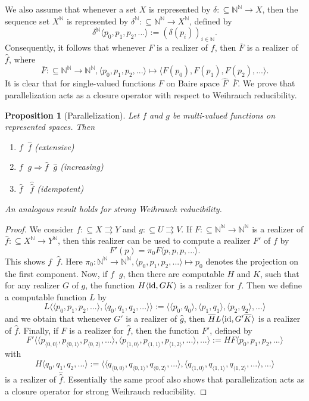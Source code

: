 \documentclass[jsl,10pt]{noasl}
\def\IN{{\mathbb{N}}}
\def\TO{\Longrightarrow}
\def\In{\subseteq}
\def\mto{\rightrightarrows}
\def\id{{\rm id}}
\def\leqW{\mathop{\leq_{\mathrm{W}}}}
\def\equivW{\mathop{\equiv_{\mathrm{W}}}}
\def\equivSW{\mathop{\equiv_{\mathrm{sW}}}}
\newtheorem{proposition}{Proposition}[section]
\begin{document}
We also assume that whenever a set $X$ is represented by $\delta:\In\IN^\IN\to X$, then
the sequence set $X^\IN$ is represented by $\delta^\IN:\In\IN^\IN\to X^\IN$, defined by
\[\delta^\IN\langle p_0,p_1,p_2,...\rangle:=(\delta(p_i))_{i\in\IN}.\]
Consequently, it follows that whenever $F$ is a realizer of $f$, then
$\overline{F}$ is a realizer of $\widehat{f}$, where 
\[\overline{F}:\In\IN^\IN\to\IN^\IN,\langle p_0,p_1,p_2,...\rangle\mapsto\langle F(p_0),F(p_1),F(p_2),...\rangle.\]
It is clear that for single-valued functions $F$ 
on Baire space $\widehat{F}\equivSW\overline{F}$.
We prove that parallelization acts as a closure operator with
respect to Weihrauch reducibility.

\begin{proposition}[Parallelization]
\label{prop:parallelization}
Let $f$ and $g$ be multi-valued functions on represented spaces. Then
\begin{enumerate}
\item $f\leqW\widehat{f}$                       \hfill (extensive)
\item $f\leqW g\TO\widehat{f}\leqW\widehat{g}$  \hfill (increasing)
\item $\widehat{f}\equivW\;\widehat{\!\!\widehat{f}}$ \hfill (idempotent)
\end{enumerate}
An analogous result holds for strong Weihrauch reducibility.
\end{proposition}
\begin{proof}
We consider $f:\In X\mto Y$ and $g:\In U\mto V$.
If $F:\In\IN^\IN\to\IN^\IN$ is a realizer of $\widehat{f}:\In X^\IN\to Y^\IN$,
then this realizer can be used to compute a realizer $F'$ of $f$ by
\[F'(p)=\pi_0F\langle p,p,p,...\rangle.\]
This shows $f\leqW\widehat{f}$. Here 
$\pi_0:\IN^\IN\to\IN^\IN,\langle p_0,p_1,p_2,...\rangle\mapsto p_0$
denotes the projection on the first component.
Now, if $f\leqW g$, then there are computable $H$ and $K$, such
that for any realizer $G$ of $g$, the function $H\langle\id,GK\rangle$
is a realizer for $f$. Then we define a computable function $L$ by
\[L\langle\langle p_0,p_1,p_2,...\rangle,\langle q_0,q_1,q_2,...\rangle\rangle:=
  \langle\langle p_0,q_0\rangle,\langle p_1,q_1\rangle,\langle p_2,q_2\rangle,...\rangle\]
and we obtain that whenever $G'$ is a realizer of $\widehat{g}$, then
$\overline{H}L\langle\id,G'\overline{K}\rangle$ is a realizer of $\widehat{f}$.
Finally, if $F$ is a realizer for $\widehat{f}$, then the function $F'$,
defined by
\[F'\langle\langle p_{\langle 0,0\rangle},p_{\langle 0,1\rangle},p_{\langle 0,2\rangle},...\rangle,\langle p_{\langle 1,0\rangle},p_{\langle 1,1\rangle},p_{\langle 1,2\rangle},...\rangle,...\rangle
  :=HF\langle p_0,p_1,p_2,...\rangle\]
with
\[H\langle q_0,q_1,q_2,...\rangle:=\langle\langle q_{\langle 0,0\rangle},q_{\langle 0,1\rangle},q_{\langle 0,2\rangle},...\rangle,\langle q_{\langle 1,0\rangle},q_{\langle 1,1\rangle},q_{\langle 1,2\rangle},...\rangle,...\rangle\]
is a realizer of $\widehat{\widehat{f}}$.
Essentially the same proof also shows that parallelization acts as a closure operator
for strong Weihrauch reducibility.
\end{proof}
\end{document}
